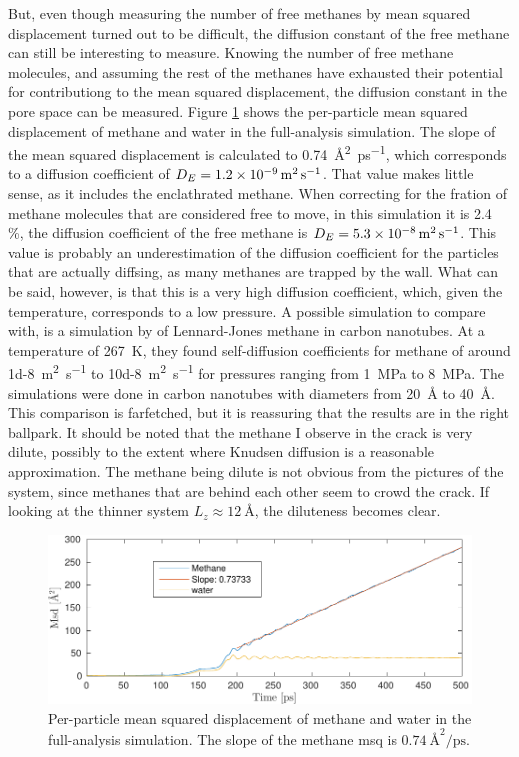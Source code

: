 But, even though measuring the number of free methanes by mean squared displacement turned out to be difficult, the diffusion constant of the free methane can still be interesting to measure. Knowing the number of free methane molecules, and assuming the rest of the methanes have exhausted their potential for contributiong to the mean squared displacement, the diffusion constant in the pore space can be measured. Figure \ref{fig:msq_methane_crack} shows the per-particle mean squared displacement of methane and water in the full-analysis simulation. The slope of the mean squared displacement is calculated to \SI{0.74}{\angstrom\squared\per\pico\second}, which corresponds to a diffusion coefficient of $D_E = \SI{1.2d-9}{\meter\squared\per\second}$. That value makes little sense, as it includes the enclathrated methane. When correcting for the fration of methane molecules that are considered free to move, in this simulation it is 2.4 \%, the diffusion coefficient of the free methane is $D_E = \SI{5.3d-8}{\meter\squared\per\second}$. This value is probably an underestimation of the diffusion coefficient for the particles that are actually diffsing, as many methanes are trapped by the wall. What can be said, however, is that this is a very high diffusion coefficient, which, given the temperature, corresponds to a low pressure. A possible simulation to compare with, is a simulation by \citet{Cao2004} of Lennard-Jones methane in carbon nanotubes. At a temperature of \SI{267}{\kelvin}, they found self-diffusion coefficients for methane of around \SI{1d-8}{\meter\squared\per\second} to \SI{10d-8}{\meter\squared\per\second} for pressures ranging from \SI{1}{\mega\pascal} to \SI{8}{\mega\pascal}. The simulations were done in carbon nanotubes with diameters from \SI{20}{\angstrom} to \SI{40}{\angstrom}. This comparison is farfetched, but it is reassuring that the results are in the right ballpark. It should be noted that the methane I observe in the crack is very dilute, possibly to the extent where Knudsen diffusion is a reasonable approximation. The methane being dilute is not obvious from the pictures of the system, since methanes that are behind each other seem to crowd the crack. If looking at the thinner system $L_z \approx \SI{12}{\angstrom}$, the diluteness becomes clear.

\begin{figure}
\centering
\includegraphics[width=14cm]{../figures/thesis/methane_crack_diffusion.pdf}
\caption{Per-particle mean squared displacement of methane and water in the full-analysis simulation. The slope of the methane msq is $\SI{0.74}{\angstrom\squared\per\pico\second}$.}
\label{fig:msq_methane_crack}
\end{figure}

